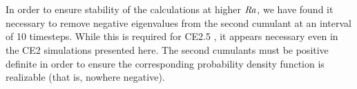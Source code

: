\documentclass{jfm}
\newcommand{\Ray}{\mbox{\textit{Ra}}}  %
\begin{document}
\appendix
\section{}\label{appA}
In order to ensure stability of the calculations at higher $\Ray$, we have found it necessary to remove negative eigenvalues from the second cumulant at an interval of 10 timesteps.
While this is required for CE2.5 \citep{marston_qi_tobias_2019}, it appears necessary even in the CE2 simulations presented here.
The second cumulants must be positive definite in order to ensure the corresponding probability density function is realizable (that is, nowhere negative).




\end{document}
